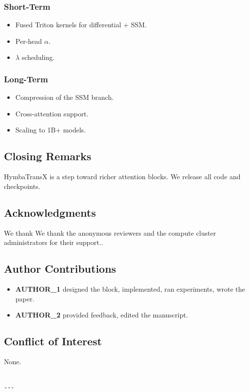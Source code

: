 \subsubsection{Short-Term}
\begin{itemize}
\item Fused Triton kernels for differential + SSM.
\item Per-head $\alpha$.
\item $\lambda$ scheduling.

\end{itemize}
\subsubsection{Long-Term}
\begin{itemize}
\item Compression of the SSM branch.
\item Cross-attention support.
\item Scaling to 1B+ models.

\end{itemize}
\subsection{Closing Remarks}

HymbaTransX is a step toward richer attention blocks. We release all code 
and checkpoints.

\subsection{Acknowledgments}

We thank We thank the anonymous reviewers and the compute cluster administrators for their support..

\subsection{Author Contributions}

\begin{itemize}
\item \textbf{{{AUTHOR\_1}}} designed the block, implemented, ran experiments, wrote
  the paper.
\item \textbf{{{AUTHOR\_2}}} provided feedback, edited the manuscript.

\end{itemize}
\subsection{Conflict of Interest}

None.
\begin{lstlisting}

---
\end{lstlisting}